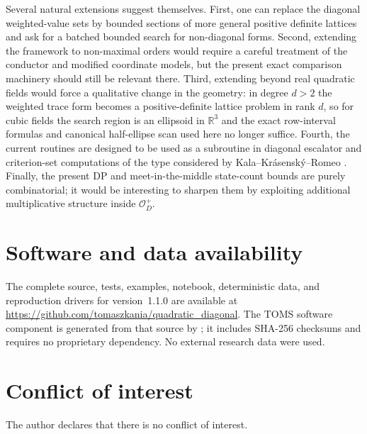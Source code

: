 \documentclass[manuscript]{acmart}
\theoremstyle{plain}
\theoremstyle{definition}
\theoremstyle{nonitalicremark}
\newcommand{\R}{\mathbb{R}}
\newcommand{\OO}{\mathcal{O}}
\newcommand{\OD}{\OO_D}
\begin{document}
Several natural extensions suggest themselves. First, one can replace the diagonal weighted-value
sets by bounded sections of more general positive definite lattices and ask for a batched bounded
search for non-diagonal forms. Second, extending the framework to non-maximal orders would require a
careful treatment of the conductor and modified coordinate models, but the present exact comparison
machinery should still be relevant there. Third, extending beyond real quadratic fields would force a
qualitative change in the geometry: in degree $d>2$ the weighted trace form becomes a positive-definite
lattice problem in rank $d$, so for cubic fields the search region is an ellipsoid in $\R^3$ and the
exact row-interval formulas and canonical half-ellipse scan used here no longer suffice. Fourth, the
current routines are designed to be used as a subroutine in diagonal escalator and criterion-set
computations of the type considered by Kala--Kr\'asensk\'y--Romeo \cite{KKR}. Finally, the present
DP and meet-in-the-middle state-count bounds are purely combinatorial; it would be interesting to
sharpen them by exploiting additional multiplicative structure inside $\OD^+$.


\section*{Software and data availability}
The complete source, tests, examples, notebook, deterministic data, and reproduction drivers for
version~1.1.0 are available at
\url{https://github.com/tomaszkania/quadratic_diagonal}. The TOMS software component is generated
from that source by ; it includes SHA-256 checksums and
requires no proprietary dependency. No external research data were used.

\section*{Conflict of interest}
The author declares that there is no conflict of interest.



\end{document}
